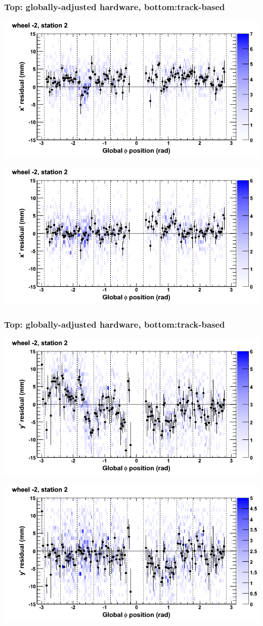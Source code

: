 \documentclass[compress]{beamer}
\begin{document}
\begin{frame}
\frametitle{Top: globally-adjusted hardware, bottom:track-based}
\includegraphics[width=0.7\linewidth]{NOV4_mapplots_HW/DTvsphi_st2whA_x.png}

\includegraphics[width=0.7\linewidth]{NOV4_mapplots/DTvsphi_st2whA_x.png}
\end{frame}

\begin{frame}
\frametitle{Top: globally-adjusted hardware, bottom:track-based}
\includegraphics[width=0.7\linewidth]{NOV4_mapplots_HW/DTvsphi_st2whA_y.png}

\includegraphics[width=0.7\linewidth]{NOV4_mapplots/DTvsphi_st2whA_y.png}
\end{frame}
\end{document}
